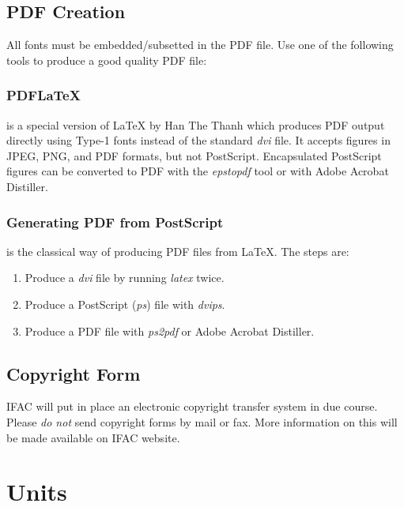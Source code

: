 \documentclass{ifacconf}
\begin{document}
\subsection{PDF Creation}

All fonts must be embedded/subsetted in the PDF file. Use one of the
following tools to produce a good quality PDF file:

\subsubsection{PDFLaTeX} is a special version of LaTeX by Han The
Thanh which produces PDF output directly using Type-1 fonts instead of
the standard \textit{dvi} file. It accepts figures in JPEG, PNG, and PDF
formats, but not PostScript. Encapsulated PostScript figures can be
converted to PDF with the \textit{epstopdf} tool or with Adobe Acrobat
Distiller.

\subsubsection{Generating PDF from PostScript} is the classical way of
producing PDF files from LaTeX. The steps are:

\begin{enumerate}
  \item Produce a \textit{dvi} file by running \textit{latex} twice.
  \item Produce a PostScript (\textit{ps}) file with \textit{dvips}.
  \item Produce a PDF file with \textit{ps2pdf} or Adobe Acrobat
  Distiller.
\end{enumerate}

\subsection{Copyright Form}

IFAC will put in place an electronic copyright transfer system in due
course. Please \emph{do not} send copyright forms by mail or fax. More
information on this will be made available on IFAC website.


\section{Units}
\end{document}
